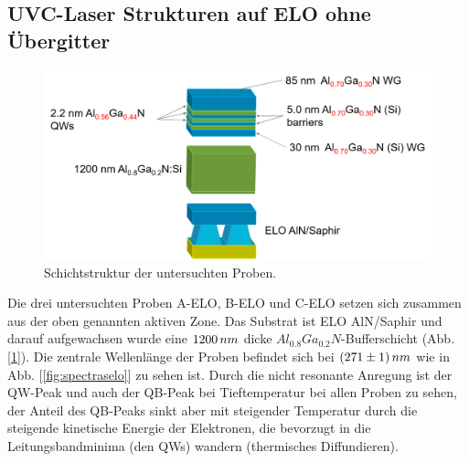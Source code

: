 \subsection{UVC-Laser Strukturen auf ELO ohne Übergitter}
%
\begin{figure}[h]
\includegraphics[width=\linewidth]{Bilder/TS4045/ts4045.png}
\caption{Schichtstruktur der untersuchten Proben.}
\label{fig:schichtenelo}
\end{figure}
\noindent 
%
Die drei untersuchten Proben A-ELO, B-ELO und C-ELO setzen sich zusammen aus der oben genannten aktiven Zone. Das Substrat ist ELO AlN/Saphir und darauf aufgewachsen wurde eine $1200 \thinspace nm$ dicke $ Al_{0.8}Ga_{0.2}N$-Bufferschicht (Abb. [\ref{fig:schichtenelo}]). Die zentrale Wellenlänge der Proben befindet sich bei $(271 \pm 1) \thinspace nm$ wie in Abb. [\ref{fig:spectraselo}] zu sehen ist. Durch die nicht resonante Anregung ist der QW-Peak und auch der QB-Peak bei Tieftemperatur bei allen Proben zu sehen, der Anteil des QB-Peaks sinkt aber mit steigender Temperatur durch die steigende kinetische Energie der Elektronen, die bevorzugt in die Leitungsbandminima (den QWs) wandern (thermisches Diffundieren).
%
